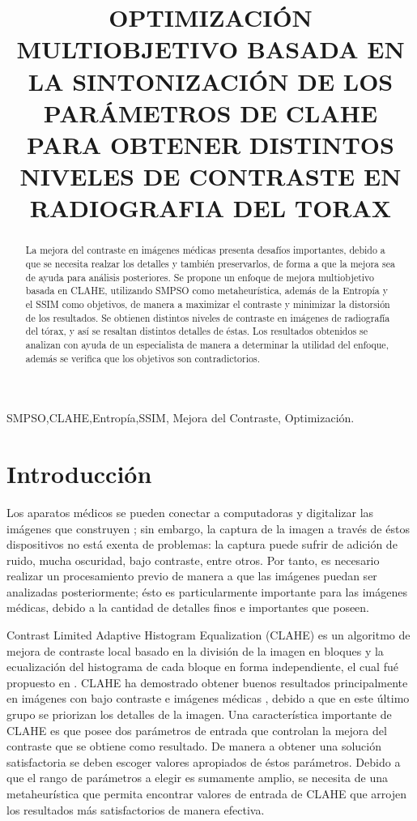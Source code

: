 \documentclass[spanish]{article}
\title{OPTIMIZACIÓN MULTIOBJETIVO BASADA EN LA SINTONIZACIÓN DE LOS PARÁMETROS DE CLAHE PARA OBTENER DISTINTOS NIVELES DE CONTRASTE EN RADIOGRAFIA DEL TORAX}
\begin{document}
%
\maketitle
%
\begin{abstract}
La mejora del contraste en imágenes médicas presenta desafíos importantes, debido a que se necesita realzar los detalles y también preservarlos, de forma a que la mejora sea de ayuda para análisis posteriores. Se propone un enfoque de mejora multiobjetivo basada en CLAHE, utilizando SMPSO como metaheurística, además de la Entropía y el SSIM como objetivos, de manera a maximizar el contraste y minimizar la distorsión de los resultados. Se obtienen distintos niveles de contraste en imágenes de radiografía del tórax, y así se resaltan distintos detalles de éstas. Los resultados obtenidos se analizan con ayuda de un especialista de manera a determinar la utilidad del enfoque, además se verifica que los objetivos son contradictorios.
\end{abstract}
%
\begin{keywords}
SMPSO,CLAHE,Entropía,SSIM, Mejora del Contraste, Optimización.
\end{keywords}
%
\section{Introducción}
\label{sec:intro}

Los aparatos médicos se pueden conectar a computadoras y digitalizar las imágenes que construyen \cite{garcia_fenoll,russ2010}; sin embargo, la captura de la imagen a través de éstos dispositivos no está exenta de problemas: la captura puede sufrir de adición de ruido, mucha oscuridad, bajo contraste, entre otros. Por tanto, es necesario realizar un procesamiento previo de manera a que las imágenes puedan ser analizadas posteriormente; ésto es particularmente importante para las imágenes médicas, debido a la cantidad de detalles finos e importantes que poseen.

Contrast Limited Adaptive Histogram Equalization (CLAHE) es un algoritmo de mejora de contraste local basado en la división de la imagen en bloques y la ecualización del histograma de cada bloque en forma independiente, el cual fué propuesto en \cite{Zuiderveld:1994:CLA:180895.180940}. CLAHE ha demostrado obtener buenos resultados principalmente en imágenes con bajo contraste \cite{balvant2011} e imágenes médicas \cite{saikat2011,shelda2013}, debido a que en este último grupo se priorizan los detalles de la imagen. Una característica importante de CLAHE es que posee dos parámetros de entrada que controlan la mejora del contraste que se obtiene como resultado. De manera a obtener una solución satisfactoria se deben escoger valores apropiados de éstos parámetros. Debido a que el rango de parámetros a elegir es sumamente amplio, se necesita de una metaheurística que permita encontrar valores de entrada de CLAHE que arrojen los resultados más satisfactorios de manera efectiva.
\end{document}
